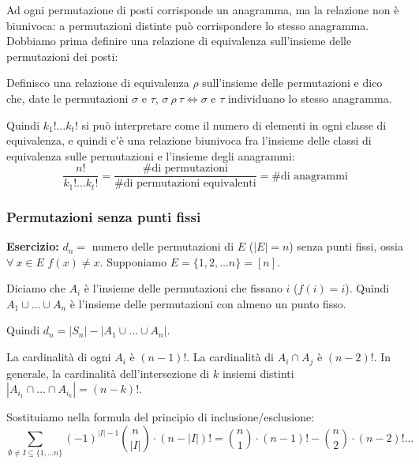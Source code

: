 Ad ogni permutazione di posti corrisponde un anagramma, ma la relazione non \`e biunivoca: a permutazioni distinte pu\`o corrispondere lo stesso anagramma. Dobbiamo prima definire una relazione di equivalenza sull'insieme delle permutazioni dei posti:
\begin{defn}
Definisco una relazione di equivalenza $\rho$ sull'insieme delle permutazioni e dico che, date le permutazioni $\sigma$ e $\tau$, $\sigma \ \rho \ \tau \Leftrightarrow \sigma$ e $\tau$ individuano lo stesso anagramma.
\end{defn}
Quindi $k_1! \dots k_t!$ si pu\`o interpretare come il numero di elementi in ogni classe di equivalenza, e quindi c'\`e una relazione biunivoca fra l'insieme delle classi di equivalenza sulle permutazioni e l'insieme degli anagrammi:
\[
\frac{n!}{k_1! \dots k_t!} = \frac{\text{\# di permutazioni}}{\text{\# di permutazioni equivalenti}} = \text{\# di anagrammi}
\]

\subsubsection{Permutazioni senza punti fissi}

\textbf{Esercizio:} $d_n = $ numero delle permutazioni di $E$ ($|E| = n$) senza punti fissi, ossia $\forall \ x \in E $ $ f(x) \neq x$. Supponiamo $E = \{1, 2, \dots n \} = [n]$.

Diciamo che $A_i$ \`e l'insieme delle permutazioni che fissano $i$ ($f(i) = i$). Quindi $A_1 \cup \dots \cup A_n$ \`e l'insieme delle permutazioni con almeno un punto fisso.

Quindi $d_n = |S_n| - |A_1 \cup \dots \cup A_n|$.

La cardinalit\`a di ogni $A_i$ \`e $(n - 1)!$. La cardinalit\`a di $A_i \cap A_j $ \`e $(n - 2)!$. In generale, la cardinalit\`a dell'intersezione di $k$ insiemi distinti $|A_{i_1} \cap \dots \cap A_{i_k}| = (n - k)!$.

Sostituiamo nella formula del principio di inclusione/esclusione:
\[
\sum_{\emptyset \neq I \subseteq \{1, \dots n \}} (-1)^{|I| - 1} \binom{n}{|I|} \cdot (n - |I|)! =
\binom{n}{1} \cdot (n-1)! - \binom{n}{2} \cdot (n - 2)! \dots
\]








